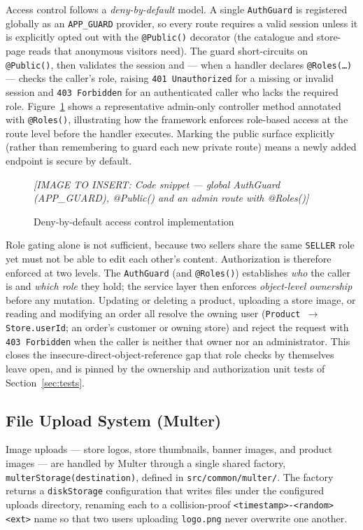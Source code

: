 \documentclass[12pt, a4paper, oneside]{report}
\newcommand{\imagePlaceholder}[2][8cm]{%
  \begin{mdframed}[backgroundcolor=cheebolightgray,linecolor=gray!40]
    \centering
    \vspace{#1}
    \textit{\color{gray}[IMAGE TO INSERT: #2]}
    \vspace{8mm}
  \end{mdframed}
}
\begin{document}
Access control follows a \emph{deny-by-default} model. A single
\texttt{AuthGuard} is registered globally as an \texttt{APP\_GUARD}
provider, so every route requires a valid session unless it is
explicitly opted out with the \texttt{@Public()} decorator (the
catalogue and store-page reads that anonymous visitors need). The
guard short-circuits on \texttt{@Public()}, then validates the session
and --- when a handler declares \texttt{@Roles(\ldots)} --- checks the
caller's role, raising \texttt{401 Unauthorized} for a missing or
invalid session and \texttt{403 Forbidden} for an authenticated caller
who lacks the required role. Figure~\ref{fig:rbac} shows a
representative admin-only controller method annotated with
\texttt{@Roles()}, illustrating how the framework enforces role-based
access at the route level before the handler executes. Marking the
public surface explicitly (rather than remembering to guard each new
private route) means a newly added endpoint is secure by default.

\begin{figure}[H]
  \centering
  \imagePlaceholder[5cm]{Code snippet — global AuthGuard (APP\_GUARD), @Public() and an admin route with @Roles()}
  \caption{Deny-by-default access control implementation}
  \label{fig:rbac}
\end{figure}

Role gating alone is not sufficient, because two sellers share the
same \texttt{SELLER} role yet must not be able to edit each other's
content. Authorization is therefore enforced at two levels. The
\texttt{AuthGuard} (and \texttt{@Roles()}) establishes \emph{who} the
caller is and \emph{which role} they hold; the service layer then
enforces \emph{object-level ownership} before any mutation. Updating or
deleting a product, uploading a store image, or reading and modifying
an order all resolve the owning user
(\texttt{Product\,$\rightarrow$\,Store.userId}; an order's customer or
owning store) and reject the request with \texttt{403 Forbidden} when
the caller is neither that owner nor an administrator. This closes the insecure-direct-object-reference
gap that role checks by themselves leave open, and is pinned by the
ownership and authorization unit tests of Section~\ref{sec:tests}.

\subsection{File Upload System (Multer)}

Image uploads --- store logos, store thumbnails, banner images, and
product images --- are handled by Multer through a single shared
factory, \texttt{multerStorage(destination)}, defined in
\texttt{src/common/multer/}. The factory returns a \texttt{diskStorage}
configuration that writes files under the configured uploads
directory, renaming each to a collision-proof
\texttt{<timestamp>-<random><ext>} name so that two users uploading
\texttt{logo.png} never overwrite one another.
\end{document}

